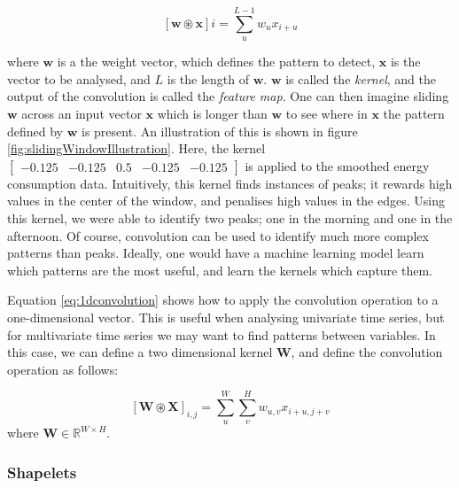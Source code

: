 \begin{equation}\label{eq:1dconvolution}
    [\boldsymbol{w} \circledast \boldsymbol{x}]i = \sum_u^{L-1} w_u x_{i+u}
\end{equation}

where $\boldsymbol{w}$ is a the weight vector, which defines the pattern to detect, $\boldsymbol{x}$ is the vector to be analysed, and $L$ is the length of $\boldsymbol{w}$. $\boldsymbol{w}$ is called the \emph{kernel}, and the output of the convolution is called the \emph{feature map}. One can then imagine sliding $\boldsymbol{w}$ across an input vector $\boldsymbol{x}$ which is longer than $\boldsymbol{w}$ to see where in $\boldsymbol{x}$ the pattern defined by $\boldsymbol{w}$ is present. An illustration of this is shown in figure \ref{fig:slidingWindowIllustration}. Here, the kernel $\begin{bmatrix}-0.125 & -0.125 & 0.5 & -0.125 & -0.125 \end{bmatrix}$ is applied to the smoothed energy consumption data. Intuitively, this kernel finds instances of peaks; it rewards high values in the center of the window, and penalises high values in the edges. Using this kernel, we were able to identify two peaks; one in the morning and one in the afternoon. Of course, convolution can be used to identify much more complex patterns than peaks. Ideally, one would have a machine learning model learn which patterns are the most useful, and learn the kernels which capture them.

Equation \ref{eq:1dconvolution} shows how to apply the convolution operation to a one-dimensional vector. This is useful when analysing univariate time series, but for multivariate time series we may want to find patterns between variables. In this case, we can define a two dimensional kernel $\mathbf{W}$, and define the convolution operation as follows:

\begin{equation}\label{eq:2dconvolution}
    [\mathbf{W} \circledast \mathbf{X}]_{i,j} = \sum_u^W \sum_v^H w_{u,v}x_{i+u,j+v}
\end{equation}
where $\mathbf{W}\in \mathbb{R}^{W\times H}$.


\subsubsection{Shapelets}
